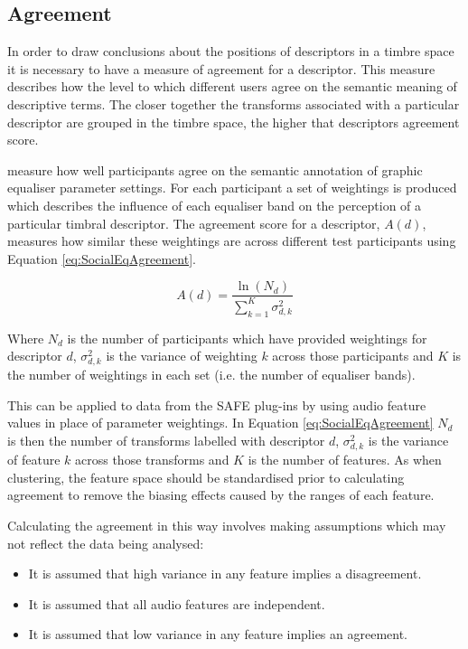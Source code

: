 	\subsection{Agreement}
	\label{sec:TimbreEvaluation-Analysis-Agreement}
		In order to draw conclusions about the positions of descriptors in a timbre space it is necessary to have a
		measure of agreement for a descriptor. This measure describes how the level to which different users agree
		on the semantic meaning of descriptive terms. The closer together the transforms associated with a
		particular descriptor are grouped in the timbre space, the higher that descriptors agreement score.

		\citet{cartwright2013socialeq} measure how well participants agree on the semantic annotation of graphic
		equaliser parameter settings. For each participant a set of weightings is produced which describes the
		influence of each equaliser band on the perception of a particular timbral descriptor. The agreement score
		for a descriptor, $A(d)$, measures how similar these weightings are across different test participants
		using Equation \ref{eq:SocialEqAgreement}.

		\begin{equation}
			A(d) = \frac{\ln(N_{d})}{\sum_{k = 1}^{K} \sigma_{d,k}^{2}}
			\label{eq:SocialEqAgreement}
		\end{equation}

		Where $N_{d}$ is the number of participants which have provided weightings for descriptor $d$,
		$\sigma_{d,k}^{2}$ is the variance of weighting $k$ across those participants and $K$ is the number of
		weightings in each set (i.e. the number of equaliser bands).


		This can be applied to data from the SAFE plug-ins by using audio feature values in place of parameter
		weightings. In Equation \ref{eq:SocialEqAgreement} $N_{d}$ is then the number of transforms labelled with
		descriptor $d$, $\sigma_{d,k}^{2}$ is the variance of feature $k$ across those transforms and $K$ is the
		number of features. As when clustering, the feature space should be standardised prior to calculating
		agreement to remove the biasing effects caused by the ranges of each feature.

		Calculating the agreement in this way involves making assumptions which may not reflect the data being
		analysed:

		\begin{itemize}
			\item It is assumed that high variance in any feature implies a disagreement. 
			\item It is assumed that all audio features are independent. 
			\item It is assumed that low variance in any feature implies an agreement. 
		\end{itemize}

